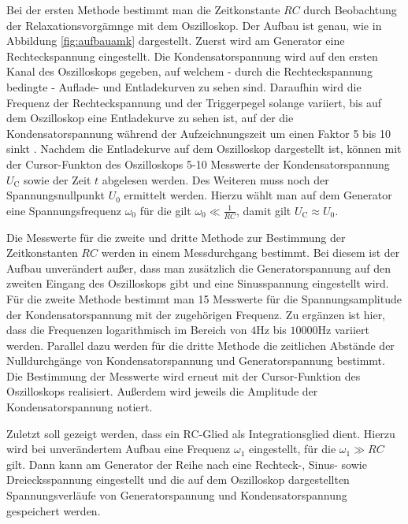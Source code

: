 Bei der ersten Methode bestimmt man die Zeitkonstante $RC$ durch Beobachtung der Relaxationsvorgämnge mit dem Oszilloskop.
Der Aufbau ist genau, wie in Abbildung \ref{fig:aufbauamk} dargestellt.
Zuerst wird am Generator eine Rechteckspannung eingestellt.
Die Kondensatorspannung wird auf den ersten Kanal des Oszilloskops gegeben, auf welchem - durch
die Rechteckspannung bedingte - Auflade- und Entladekurven zu sehen sind.
Daraufhin wird die Frequenz der Rechteckspannung und der Triggerpegel solange variiert, bis
auf dem Oszilloskop eine Entladekurve zu sehen ist, auf der die Kondensatorspannung während der
Aufzeichnungszeit um einen Faktor 5 bis 10 sinkt \cite{Anleitung}.
Nachdem die Entladekurve auf dem Oszilloskop dargestellt ist, können mit der Cursor-Funkton
des Oszilloskops 5-10 Messwerte der Kondensatorspannung $U_{\text{C}}$ sowie der Zeit $t$
abgelesen werden.
Des Weiteren muss noch der Spannungsnullpunkt $U_0$ ermittelt werden.
Hierzu wählt man auf dem Generator eine Spannungsfrequenz $\omega_0$ für die gilt
$\omega_0 \ll \frac{1}{RC}$, damit gilt $U_{\text{C}} \approx U_0$.

Die Messwerte für die zweite und dritte Methode zur Bestimmung der Zeitkonstanten $RC$ werden
in einem Messdurchgang bestimmt.
Bei diesem ist der Aufbau unverändert außer, dass man zusätzlich die Generatorspannung auf den zweiten Eingang des Oszilloskops gibt und eine Sinusspannung eingestellt wird.
Für die zweite Methode bestimmt man 15 Messwerte für die Spannungsamplitude der Kondensatorspannung mit der zugehörigen Frequenz. Zu ergänzen ist hier, dass die Frequenzen logarithmisch im Bereich von $4 \si{\Hz}$ bis $10000 \si{\Hz}$ variiert werden.
Parallel dazu %
werden für die dritte Methode die zeitlichen Abstände der Nulldurchgänge von Kondensatorspannung und Generatorspannung bestimmt.
Die Bestimmung der Messwerte wird erneut mit der Cursor-Funktion des Oszilloskops realisiert.
Außerdem wird jeweils die Amplitude der Kondensatorspannung notiert.

Zuletzt soll gezeigt werden, dass ein RC-Glied als Integrationsglied dient.
Hierzu wird bei unverändertem Aufbau eine Frequenz $\omega_1$ eingestellt, für die $\omega_1 \gg RC$ gilt. Dann kann am Generator der Reihe nach eine Rechteck-, Sinus- sowie Dreiecksspannung eingestellt und die auf dem Oszilloskop dargestellten Spannungsverläufe von Generatorspannung und Kondensatorspannung gespeichert werden.
